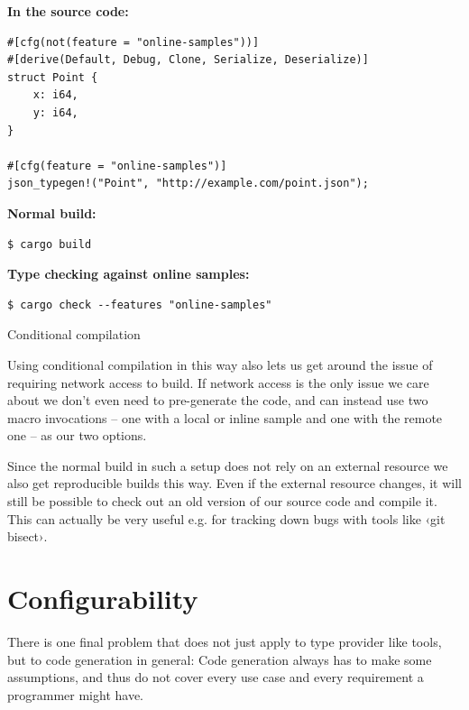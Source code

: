 \begin{listing}[ht!]
\textbf{In the source code:}
\begin{verbatim}
#[cfg(not(feature = "online-samples"))]
#[derive(Default, Debug, Clone, Serialize, Deserialize)]
struct Point {
    x: i64,
    y: i64,
}

#[cfg(feature = "online-samples")]
json_typegen!("Point", "http://example.com/point.json");
\end{verbatim}
\vspace{5mm}

\textbf{Normal build:}
\begin{verbatim}
$ cargo build
\end{verbatim}
\vspace{5mm}

\textbf{Type checking against online samples:}
\begin{verbatim}
$ cargo check --features "online-samples"
\end{verbatim}
\caption{Conditional compilation}
\label{lst:conditional-compilation}
\end{listing}

Using conditional compilation in this way also lets us get around the issue of requiring network access to build. If network access is the only issue we care about we don't even need to pre-generate the code, and can instead use two macro invocations -- one with a local or inline sample and one with the remote one -- as our two options.

Since the normal build in such a setup does not rely on an external resource we also get reproducible builds this way. Even if the external resource changes, it will still be possible to check out an old version of our source code and compile it. This can actually be very useful e.g. for tracking down bugs with tools like ‹git bisect›.

\section{Configurability}

There is one final problem that does not just apply to type provider like tools, but to code generation in general: Code generation always has to make some assumptions, and thus do not cover every use case and every requirement a programmer might have.

